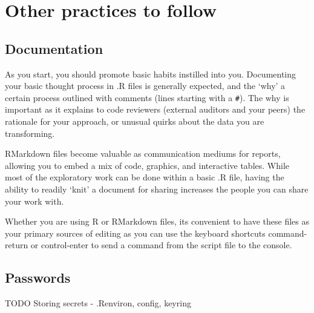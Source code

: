 \documentclass[
]{book}
\begin{document}
\hypertarget{other-practices-to-follow}{%
\chapter{Other practices to follow}\label{other-practices-to-follow}}

\hypertarget{documentation}{%
\section{Documentation}\label{documentation}}

As you start, you should promote basic habits instilled into you. Documenting your basic thought process in .R files is generally expected, and the `why' a certain process outlined with comments (lines starting with a \texttt{\#}). The why is important as it explains to code reviewers (external auditors and your peers) the rationale for your approach, or unusual quirks about the data you are transforming.

RMarkdown files become valuable as communication mediums for reports, allowing you to embed a mix of code, graphics, and interactive tables. While most of the exploratory work can be done within a basic .R file, having the ability to readily `knit' a document for sharing increases the people you can share your work with.

Whether you are using R or RMarkdown files, its convenient to have these files as your primary sources of editing as you can use the keyboard shortcuts command-return or control-enter to send a command from the script file to the console.

\hypertarget{passwords}{%
\section{Passwords}\label{passwords}}

TODO Storing secrets - .Renviron, config, keyring

  
\end{document}
